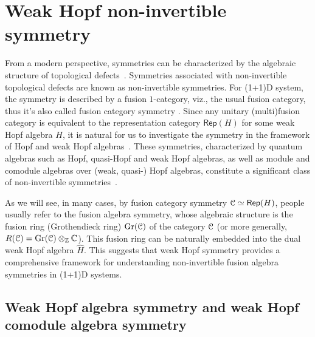 \documentclass[a4paper,11pt]{article}
\theoremstyle{theorem}
\theoremstyle{remark}
\newcommand\eC           {\EuScript{C}}
\newcommand{\Zbb}{\mathbb{Z}}
\newcommand{\Cbb}{\mathbb{C}}
\newcommand{\Rep}{\mathsf{Rep}}
\begin{document}
\section{Weak Hopf non-invertible symmetry}
\label{sec:WHAsymmetry}
From a modern perspective, symmetries can be characterized by the algebraic structure of topological defects~\cite{gaiotto2015generalized,inamura2021topological,Kong2020algebraic,SchaferNameki2024ICTP,huang2023topologicalholo,bhardwaj2024lattice,freed2024topSymTFT,gaiotto2021orbifold,bhardwaj2023generalizedcharge,apruzzi2023symmetry,bhardwaj2024gappedphases,Zhang2024anomaly,Ji2020categoricalsym,chatterjee2024TopHolo,chang2019topological,bhardwaj2018finite}.
Symmetries associated with non-invertible topological defects are known as non-invertible symmetries. For (1+1)D system, the symmetry is described by a fusion $1$-category, viz., the usual fusion category, thus it's also called fusion category symmetry \cite{bhardwaj2018finite,chang2019topological,thorngren2019fusion}.
Since any unitary (multi)fusion category is equivalent to the representation category $\Rep(H)$ for some weak Hopf algebra $H$, it is natural for us to investigate the symmetry in the framework of Hopf and weak Hopf algebras~\cite{Kitaev2003,bais2003hopf,meusburger2017kitaev,Buerschaper2013a,girelli2021semidual,jia2023boundary,Jia2023weak,jia2024weakTube,jia2024generalized}. These symmetries, characterized by quantum algebras such as Hopf, quasi-Hopf and weak Hopf algebras, as well as module and comodule algebras over (weak, quasi-) Hopf algebras, constitute a significant class of non-invertible symmetries~\cite{cordova2022snowmass,brennan2023introduction,mcgreevy2023generalized,luo2023lecture,shao2024whats,SchaferNameki2024ICTP,Bhardwaj2024lecture}.

As we will see, in many cases, by fusion category symmetry \(\eC \simeq \Rep(H)\), people usually refer to the fusion algebra symmetry, whose algebraic structure is the fusion ring (Grothendieck ring) \(\operatorname{Gr}(\eC)\) of the category \(\eC\) (or more generally, \(R(\eC) = \operatorname{Gr}(\eC) \otimes_{\Zbb} \Cbb\)). This fusion ring can be naturally embedded into the dual weak Hopf algebra \(\hat{H}\). This suggests that weak Hopf symmetry provides a comprehensive framework for understanding non-invertible fusion algebra symmetries in (1+1)D systems.





\subsection{Weak Hopf algebra symmetry and weak Hopf comodule algebra symmetry}
\end{document}
